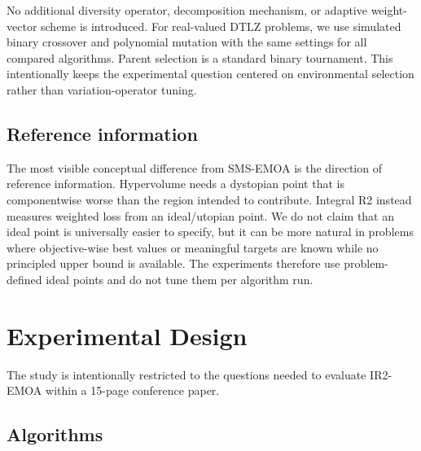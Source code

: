 \documentclass[runningheads]{llncs}
\begin{document}
No additional diversity operator, decomposition mechanism, or adaptive weight-vector scheme is introduced. For real-valued DTLZ problems, we use simulated binary crossover and polynomial mutation with the same settings for all compared algorithms. Parent selection is a standard binary tournament. This intentionally keeps the experimental question centered on environmental selection rather than variation-operator tuning.

\subsection{Reference information}

The most visible conceptual difference from SMS-EMOA is the direction of reference information. Hypervolume needs a dystopian point that is componentwise worse than the region intended to contribute. Integral R2 instead measures weighted loss from an ideal/utopian point. We do not claim that an ideal point is universally easier to specify, but it can be more natural in problems where objective-wise best values or meaningful targets are known while no principled upper bound is available. The experiments therefore use problem-defined ideal points and do not tune them per algorithm run.

\section{Experimental Design}
\label{sec:experiments}

The study is intentionally restricted to the questions needed to evaluate IR2-EMOA within a 15-page conference paper.

\subsection{Algorithms}
\end{document}
